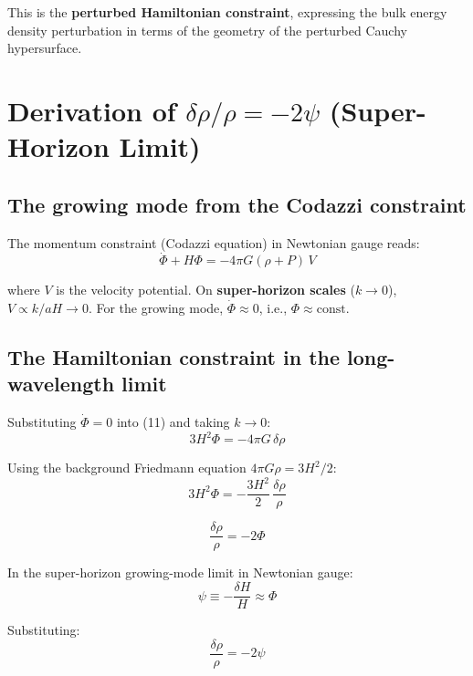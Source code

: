 \documentclass[12pt,a4paper]{article}
\begin{document}
This is the \textbf{perturbed Hamiltonian constraint}, expressing the bulk energy density perturbation in terms of the geometry of the perturbed Cauchy hypersurface.

\section{Derivation of $\delta\rho/\rho = -2\psi$ (Super-Horizon Limit)}

\subsection{The growing mode from the Codazzi constraint}

The momentum constraint (Codazzi equation) in Newtonian gauge reads:
\begin{equation}
\dot\Phi + H\Phi = -4\pi G(\rho + P)\,V \tag{12}
\end{equation}

where $V$ is the velocity potential. On \textbf{super-horizon scales} ($k \to 0$), $V \propto k/aH \to 0$. For the growing mode, $\dot\Phi \approx 0$, i.e., $\Phi \approx \text{const}$.

\subsection{The Hamiltonian constraint in the long-wavelength limit}

Substituting $\dot\Phi = 0$ into (11) and taking $k \to 0$:
\begin{equation}
3H^2\Phi = -4\pi G\,\delta\rho \tag{13}
\end{equation}

Using the background Friedmann equation $4\pi G\rho = 3H^2/2$:
\begin{equation}
3H^2\Phi = -\frac{3H^2}{2}\,\frac{\delta\rho}{\rho} \tag{14}
\end{equation}

\begin{equation}
\frac{\delta\rho}{\rho} = -2\Phi \tag{15}
\end{equation}

In the super-horizon growing-mode limit in Newtonian gauge:
\begin{equation}
\psi \equiv -\frac{\delta H}{H} \approx \Phi \tag{16}
\end{equation}

Substituting:
\begin{equation}
\boxed{\frac{\delta\rho}{\rho} = -2\psi} \tag{17}
\end{equation}
\end{document}
